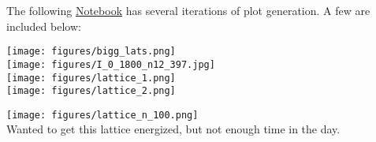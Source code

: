 \begin{enumerate}
\begin{enumerate}
   \clearpage

   The following \href{https://github.com/P-Harvey/csys303_assignments/blob/218b0b95c67ab3bb6decab0bb0a05d5ac9a6500a/plharvey_18/Flat_Lattice.ipynb}{
   Notebook} has several iterations of plot generation. A few are included below:

   \texttt{[image: figures/bigg\_lats.png]}\\
   \texttt{[image: figures/I\_0\_1800\_n12\_397.jpg]}\\
   \texttt{[image: figures/lattice\_1.png]}\\
   \texttt{[image: figures/lattice\_2.png]}
   \clearpage
   
   \texttt{[image: figures/lattice\_n\_100.png]}\\
   Wanted to get this lattice energized, but not enough time in the day.

   \solutionend


    

    
  \end{enumerate}



\end{enumerate}


